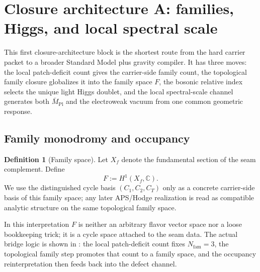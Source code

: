 \documentclass[11pt,a4paper]{article}
\theoremstyle{definition}
\newtheorem{definition}[theorem]{Definition}
\theoremstyle{remark}
\newcommand{\Mpl}{\bar M_{\mathrm{Pl}}}
\begin{document}
\section{Closure architecture A: families, Higgs, and local spectral scale}

This first closure-architecture block is the shortest route from the hard carrier packet to a broader Standard Model plus gravity compiler. It has three moves: the local patch-deficit count gives the carrier-side family count, the topological family closure globalizes it into the family space $F$, the bosonic relative index selects the unique light Higgs doublet, and the local spectral-scale channel generates both $\Mpl$ and the electroweak vacuum from one common geometric response.

\subsection{Family monodromy and occupancy}

\begin{definition}[Family space]
Let $X_f$ denote the fundamental section of the seam complement. Define
\[
F:=H^1(X_f,\mathbb C).
\]
We use the distinguished cycle basis $(C_1,C_2,C_T)$ only as a concrete carrier-side basis of this family space; any later APS/Hodge realization is read as compatible analytic structure on the same topological family space.
\end{definition}
In this interpretation $F$ is neither an arbitrary flavor vector space nor a loose bookkeeping trick; it is a cycle space attached to the seam data. The actual bridge logic is shown in : the local patch-deficit count fixes $N_{\mathrm{fam}}=3$, the topological family step promotes that count to a family space, and the occupancy reinterpretation then feeds back into the defect channel.
\end{document}

